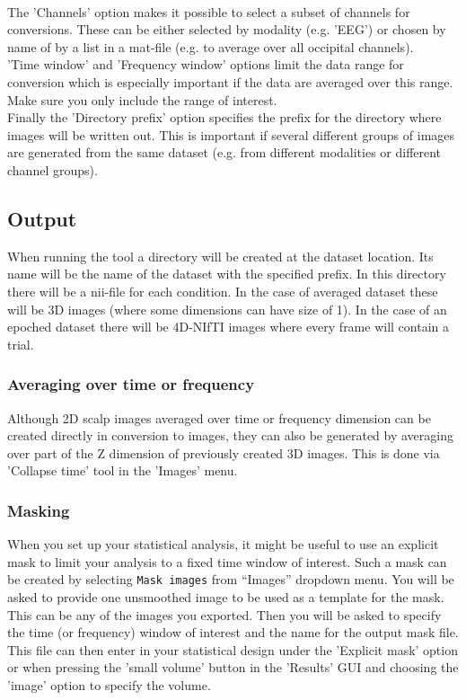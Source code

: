 \\
The 'Channels' option makes it possible to select a subset of channels for conversions. These can be either selected by modality (e.g. 'EEG') or chosen by name of by a list in a mat-file (e.g. to average over all occipital channels). 
\\
'Time window' and 'Frequency window' options limit the data range for conversion which is especially important if the data are averaged over this range. Make sure you only include the range of interest.
\\
Finally the 'Directory prefix' option specifies the prefix for the directory where images will be written out. This is important if several different groups of images are generated from the same dataset (e.g. from different modalities or different channel groups).
\\
\subsection{Output}
 When running the tool a directory will be created at the dataset location. Its name will be the name of the dataset with the specified prefix. In this directory there will be a nii-file for each condition. In the case of averaged dataset these will be 3D images (where some dimensions can have size of 1). In the case of an epoched dataset there will be 4D-NIfTI images where every frame will contain a trial. 
\\
\subsubsection{Averaging over time or frequency}
Although 2D scalp images averaged over time or frequency dimension can be created directly in conversion to images, they can also be generated by averaging over part of the Z dimension of previously created 3D images. This is done via 'Collapse time' tool in the 'Images' menu. 
\\
\subsubsection{Masking}
When you set up your statistical analysis, it might be useful to use an explicit mask to limit your analysis to a fixed time window of interest. Such a mask can be created by selecting \texttt{Mask images} from ``Images'' dropdown menu. You will be asked to provide one unsmoothed image to be used as a template for the mask. This can be any of the images you exported. Then you will be asked to specify the time (or frequency) window of interest and the name for the output mask file. This file can then enter in your statistical design under the 'Explicit mask' option or when pressing the 'small volume' button in the 'Results' GUI and choosing the 'image' option to specify the volume.
\\
